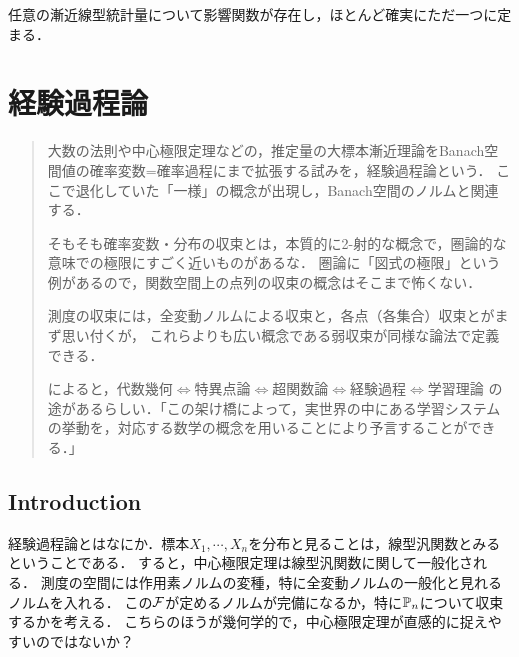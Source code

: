 \documentclass[uplatex,dvipdfmx]{jsreport}
\begin{document}
\begin{theorem}
    任意の漸近線型統計量について影響関数が存在し，ほとんど確実にただ一つに定まる．
\end{theorem}

\chapter{経験過程論}

\begin{quotation}
    大数の法則や中心極限定理などの，推定量の大標本漸近理論をBanach空間値の確率変数=確率過程にまで拡張する試みを，経験過程論という．
    ここで退化していた「一様」の概念が出現し，Banach空間のノルムと関連する．

    そもそも確率変数・分布の収束とは，本質的に2-射的な概念で，圏論的な意味での極限にすごく近いものがあるな．
    圏論に「図式の極限」という例があるので，関数空間上の点列の収束の概念はそこまで怖くない．

    測度の収束には，全変動ノルムによる収束と，各点（各集合）収束とがまず思い付くが，
    これらよりも広い概念である弱収束が同様な論法で定義できる．

    \cite{渡辺澄夫}によると，代数幾何$\Leftrightarrow$特異点論$\Leftrightarrow$超関数論$\Leftrightarrow$経験過程$\Leftrightarrow$学習理論
    の途があるらしい．「この架け橋によって，実世界の中にある学習システムの挙動を，対応する数学の概念を用いることにより予言することができる．」
\end{quotation}

\section{Introduction}

\begin{tcolorbox}[colframe=ForestGreen, colback=ForestGreen!10!white,breakable,colbacktitle=ForestGreen!40!white,coltitle=black,fonttitle=\bfseries\sffamily,
title=経験過程論]
    経験過程論とはなにか．標本$X_1,\cdots,X_n$を分布と見ることは，線型汎関数とみるということである．
    すると，中心極限定理は線型汎関数に関して一般化される．
    測度の空間には作用素ノルムの変種，特に全変動ノルムの一般化と見れるノルムを入れる．
    この$\mathcal{F}$が定めるノルムが完備になるか，特に$\mathbb{P}_n$について収束するかを考える．
    こちらのほうが幾何学的で，中心極限定理が直感的に捉えやすいのではないか？
\end{tcolorbox}
\end{document}
